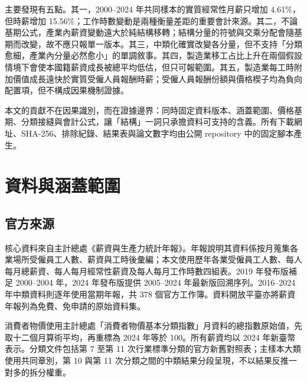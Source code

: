 \documentclass[12pt]{article}
\newcommand{\MainGrowth}{4.61}
\newcommand{\HourlyGrowth}{15.56}
\begin{document}
主要發現有五點。其一，2000--2024 年共同樣本的實質經常性月薪只增加 \MainGrowth\%，但時薪增加 \HourlyGrowth\%；工作時數變動是兩種衡量差距的重要會計來源。其二，不論基期公式，產業內薪資變動遠大於純結構移轉；結構分量的符號與交乘分配會隨基期而改變，故不應只報單一版本。其三，中類化確實改變各分量，但不支持「分類愈細，產業內分量必然愈小」的單調敘事。其四，製造業移工占比上升在兩個假設情境下會使本國籍薪資成長被總平均低估，但只可報範圍。其五，製造業每工時附加價值成長遠快於實質受僱人員報酬時薪；受僱人員報酬份額與價格楔子均為負向配置項，但不構成因果機制證據。

本文的貢獻不在因果識別，而在證據邊界：同時固定資料版本、涵蓋範圍、價格基期、分類接縫與會計公式，讓「結構」一詞只承擔資料可支持的含義。所有下載網址、SHA-256、排除紀錄、結果表與論文數字均由公開 repository 中的固定腳本產生。

\section{資料與涵蓋範圍}

\subsection{官方來源}

核心資料來自主計總處《薪資與生產力統計年報》\citep{dgbas-yearbook}。年報說明其資料係按月蒐集各業場所受僱員工人數、薪資與工時後彙編；本文使用歷年各業受僱員工人數、每人每月總薪資、每人每月經常性薪資及每人每月工作時數四組表。2019 年發布版補足 2000--2004 年，2024 年發布版提供 2005--2024 年最新版回溯序列。2016--2024 年中類資料則逐年使用當期年報，共 378 個官方工作簿。資料開放平臺亦將薪資年報列為免費、免申請的原始資料集\citep{dgbas-wage}。

消費者物價使用主計總處「消費者物價基本分類指數」月資料的總指數原始值，先取十二個月算術平均，再重標為 2024 年等於 100。所有薪資均以 2024 年新臺幣表示。分類文件包括第 7 至第 11 次行業標準分類的官方新舊對照表；主樣本大類使用共同章別，第 10 與第 11 次分類之間的中類結果分段呈現，不以結果反推一對多的拆分權重\citep{dgbas-class}。
\end{document}
